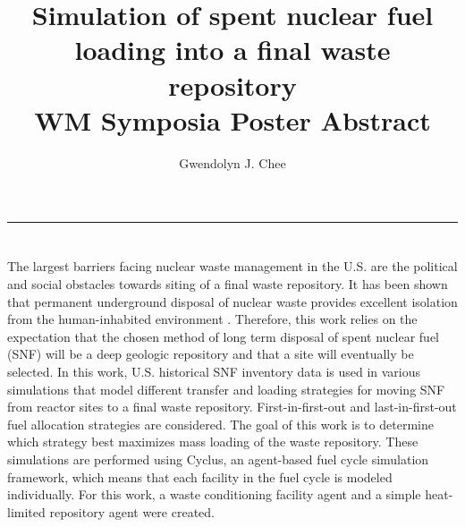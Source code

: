 \documentclass[11pt, letterpaper]{article}
\title{Simulation of spent nuclear fuel loading into a final waste repository
        \\ \vspace{0.5em} WM Symposia Poster Abstract}
\author{Gwendolyn J. Chee}
\renewcommand *\footnoterule{}
\begin{document}
	\maketitle
	\hrule

\section * {}
\doublespacing
The largest barriers facing nuclear waste management in the U.S. 
are the political and social obstacles towards siting of a final 
waste repository. 
It has been shown that permanent underground disposal of nuclear 
waste provides excellent isolation from the human-inhabited 
environment \cite{rechard_evolution_2014}. 
Therefore, this work relies on the expectation that the chosen 
method of long term disposal of spent nuclear fuel (SNF) will be 
a deep geologic repository and that a site will eventually be selected.
In this work, U.S. historical SNF inventory data 
\cite{peterson_unf-st&dards_2017} is used in various simulations that model 
different transfer and loading strategies for moving SNF from reactor 
sites to a final waste repository.  
First-in-first-out and last-in-first-out fuel allocation strategies 
are considered. The goal of this work is to determine which strategy 
best maximizes mass loading of the waste repository. 
These simulations are performed using Cyclus, an agent-based fuel cycle simulation 
framework, which means that each facility in the fuel cycle is modeled
individually. For this work, a waste conditioning facility agent 
and a simple heat-limited repository agent were created. 





\end{document}
